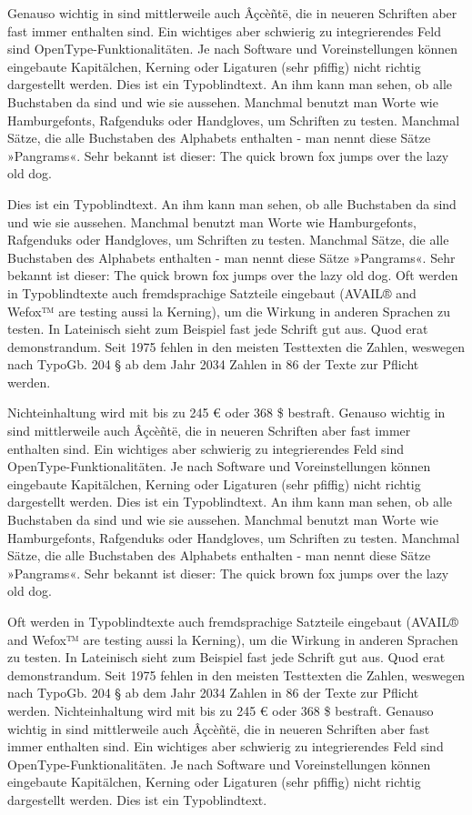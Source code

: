 Genauso wichtig in sind mittlerweile auch Âçcèñtë, die in neueren Schriften aber fast immer enthalten sind. Ein wichtiges aber schwierig zu integrierendes Feld sind OpenType-Funktionalitäten. Je nach Software und Voreinstellungen können eingebaute Kapitälchen, Kerning oder Ligaturen (sehr pfiffig) nicht richtig dargestellt werden. Dies ist ein Typoblindtext. An ihm kann man sehen, ob alle Buchstaben da sind und wie sie aussehen. Manchmal benutzt man Worte wie Hamburgefonts, Rafgenduks oder Handgloves, um Schriften zu testen. Manchmal Sätze, die alle Buchstaben des Alphabets enthalten - man nennt diese Sätze »Pangrams«. Sehr bekannt ist dieser: The quick brown fox jumps over the lazy old dog.


Dies ist ein Typoblindtext. An ihm kann man sehen, ob alle Buchstaben da sind und wie sie aussehen. Manchmal benutzt man Worte wie Hamburgefonts, Rafgenduks oder Handgloves, um Schriften zu testen. Manchmal Sätze, die alle Buchstaben des Alphabets enthalten - man nennt diese Sätze »Pangrams«. Sehr bekannt ist dieser: The quick brown fox jumps over the lazy old dog. Oft werden in Typoblindtexte auch fremdsprachige Satzteile eingebaut (AVAIL® and Wefox™ are testing aussi la Kerning), um die Wirkung in anderen Sprachen zu testen. In Lateinisch sieht zum Beispiel fast jede Schrift gut aus. Quod erat demonstrandum. Seit 1975 fehlen in den meisten Testtexten die Zahlen, weswegen nach TypoGb. 204 § ab dem Jahr 2034 Zahlen in 86 der Texte zur Pflicht werden.

Nichteinhaltung wird mit bis zu 245 € oder 368 \$ bestraft. Genauso wichtig in sind mittlerweile auch Âçcèñtë, die in neueren Schriften aber fast immer enthalten sind. Ein wichtiges aber schwierig zu integrierendes Feld sind OpenType-Funktionalitäten. Je nach Software und Voreinstellungen können eingebaute Kapitälchen, Kerning oder Ligaturen (sehr pfiffig) nicht richtig dargestellt werden. Dies ist ein Typoblindtext. An ihm kann man sehen, ob alle Buchstaben da sind und wie sie aussehen. Manchmal benutzt man Worte wie Hamburgefonts, Rafgenduks oder Handgloves, um Schriften zu testen. Manchmal Sätze, die alle Buchstaben des Alphabets enthalten - man nennt diese Sätze »Pangrams«. Sehr bekannt ist dieser: The quick brown fox jumps over the lazy old dog.

Oft werden in Typoblindtexte auch fremdsprachige Satzteile eingebaut (AVAIL® and Wefox™ are testing aussi la Kerning), um die Wirkung in anderen Sprachen zu testen. In Lateinisch sieht zum Beispiel fast jede Schrift gut aus. Quod erat demonstrandum. Seit 1975 fehlen in den meisten Testtexten die Zahlen, weswegen nach TypoGb. 204 § ab dem Jahr 2034 Zahlen in 86 der Texte zur Pflicht werden. Nichteinhaltung wird mit bis zu 245 € oder 368 \$ bestraft. Genauso wichtig in sind mittlerweile auch Âçcèñtë, die in neueren Schriften aber fast immer enthalten sind. Ein wichtiges aber schwierig zu integrierendes Feld sind OpenType-Funktionalitäten. Je nach Software und Voreinstellungen können eingebaute Kapitälchen, Kerning oder Ligaturen (sehr pfiffig) nicht richtig dargestellt werden. Dies ist ein Typoblindtext.


